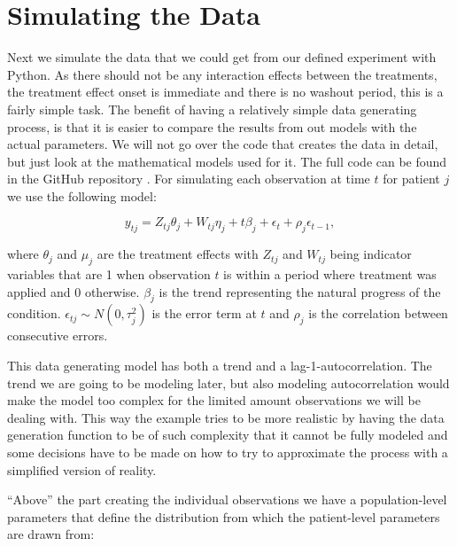 \documentclass[12pt,a4paper,leqno]{report}
\theoremstyle{plain}
\theoremstyle{definition}
\theoremstyle{remark}
\begin{document}
\section{Simulating the Data}

Next we simulate the data that we could get from our defined experiment with Python.
As there should not be any interaction effects between the treatments, the treatment
effect onset is immediate and there is no washout period, this is a fairly simple
task. The benefit of having a relatively simple data generating process, is that it is
easier to compare the results from out models with the actual parameters. We will not go
over the code that creates the data in detail, but just look at
the mathematical models used for it. The full code can be found in the GitHub repository
\cite{github}. For simulating each observation at time \(t\) for patient \(j\) we use the following model:

\begin{def}\label{simulationmodel}
    \begin{equation}\label{}
        y_{tj} = Z_{tj}\theta_{j} + W_{tj}\eta_{j} + t\beta_j + \epsilon_t + \rho_j\epsilon_{t-1},
    \end{equation}
\end{def}where \(\theta_j\) and \(\mu_j\) are the treatment effects with \(Z_{tj}\) and \(W_{tj}\) being indicator
variables that are 1 when observation \(t\) is within a period where treatment was applied and
0 otherwise. \(\beta_j\) is the trend representing the natural progress of the
condition. \(\epsilon_{tj} \sim N(0,\tau_j^2) \) is the error term at \(t\) and
\(\rho_j\) is the correlation between consecutive errors.

This data generating model has both a trend and a lag-1-autocorrelation. The trend we
are going to be modeling later, but also modeling autocorrelation would make the model
too complex for the limited amount observations we will be dealing with. This way the example tries to be more realistic
by having the data generation function to be of such complexity that it cannot be
fully modeled and some decisions have to be made on how to try to approximate
the process with a simplified version of reality.

``Above'' the part creating the individual observations we have a population-level parameters
that define the distribution from which the patient-level parameters are drawn from:

\bigskip
\end{document}

